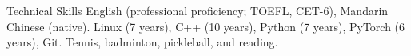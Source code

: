 
\begin{rubric}{Technical Skills}
\entry*[Languages]
	English (professional proficiency; TOEFL, CET-6), Mandarin Chinese (native).
	Linux (7 years), C++ (10 years), Python (7 years), PyTorch (6 years), Git.
\entry*[Hobbies]
	Tennis, badminton, pickleball, and reading.
\end{rubric}
